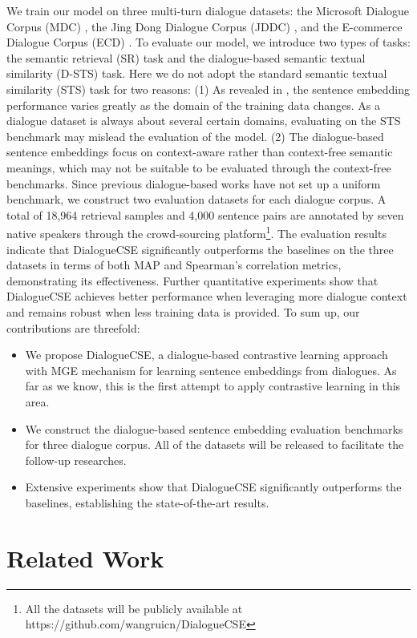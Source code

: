 \documentclass[11pt]{article}
\begin{document}
We train our model on three multi-turn dialogue datasets: the Microsoft Dialogue Corpus (MDC) \cite{mdc}, the Jing Dong Dialogue Corpus (JDDC) \cite{jddc}, and the E-commerce Dialogue Corpus (ECD) \cite{edc}.
To evaluate our model, we introduce two types of tasks: the semantic retrieval (SR) task and the dialogue-based semantic textual similarity (D-STS) task.
Here we do not adopt the standard semantic textual similarity (STS) task \cite{sts_b} for two reasons:
(1) As revealed in \cite{is_bert}, the sentence embedding performance varies greatly as the domain of the training data changes.
As a dialogue dataset is always about several certain domains, evaluating on the STS benchmark may mislead the evaluation of the model.
(2) The dialogue-based sentence embeddings focus on context-aware rather than context-free semantic meanings, which may not be suitable to be evaluated through the context-free benchmarks.
Since previous dialogue-based works have not set up a uniform benchmark, we construct two evaluation datasets for each dialogue corpus.
A total of 18,964 retrieval samples and 4,000 sentence pairs are annotated by seven native speakers through the crowd-sourcing platform\footnote{All the datasets will be publicly available at https://github.com/wangruicn/DialogueCSE}.
The evaluation results indicate that DialogueCSE significantly outperforms the baselines on the three datasets in terms of both MAP and Spearman's correlation metrics, demonstrating its effectiveness.
Further quantitative experiments show that DialogueCSE achieves better performance when leveraging more dialogue context and remains robust when less training data is provided.
To sum up, our contributions are threefold:
\begin{itemize}
  \item We propose DialogueCSE, a dialogue-based contrastive learning approach with MGE mechanism for learning sentence embeddings from dialogues. 
  As far as we know, this is the first attempt to apply contrastive learning in this area.
  \item We construct the dialogue-based sentence embedding evaluation benchmarks for three dialogue corpus. 
  All of the datasets will be released to facilitate the follow-up researches.
  \item Extensive experiments show that DialogueCSE significantly outperforms the baselines, establishing the state-of-the-art results.
\end{itemize}

\section{Related Work}
\end{document}
